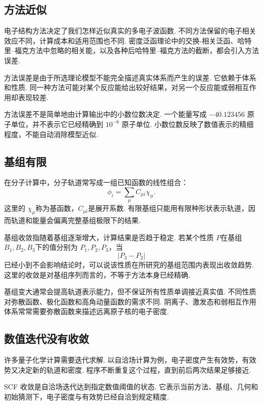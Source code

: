 \documentclass[UTF8,11pt,a4paper,openany]{ctexbook}
\begin{document}
\subsection{方法近似}

电子结构方法决定了我们怎样近似真实的多电子波函数. 不同方法保留的电子相关效应不同，计算成本和适用范围也不同. 密度泛函理论中的交换-相关泛函、哈特里--福克方法中忽略的相关能，以及各种后哈特里--福克方法的截断，都会引入方法误差. 

\begin{definitionbox}
方法误差是由于所选理论模型不能完全描述真实体系而产生的误差. 它依赖于体系和性质. 同一种方法可能对某个反应能给出较好结果，对另一个反应能或弱相互作用却表现较差. 
\end{definitionbox}

方法误差不是简单地由计算输出中的小数位数决定. 一个能量写成 $-40.123456$ 原子单位，并不表示它已经精确到 $10^{-6}$ 原子单位. 小数位数反映了数值表示的精细程度，不能自动消除模型近似. 

\subsection{基组有限}

在分子计算中，分子轨道常写成一组已知函数的线性组合：
\[
\phi_i=\sum_{\mu}C_{\mu i}\chi_\mu.
\]
这里的 $\chi_\mu$称为基函数，$C_{\mu i}$是展开系数. 有限基组只能用有限种形状表示轨道，因而轨道和能量会偏离完整基组极限下的结果. 

\begin{notationbox}
基组收敛指随着基组逐渐增大，计算结果是否趋于稳定. 若某个性质 $P$在基组 $B_1,B_2,B_3$下的值分别为 $P_1,P_2,P_3$，当
\[
|P_3-P_2|
\]
已经小到不会影响结论时，可以说该性质在所研究的基组范围内表现出收敛趋势. 这里的收敛是对基组序列而言的，不等于方法本身已经精确. 
\end{notationbox}

基组变大通常会提高轨道表示能力，但不保证所有性质单调接近真实值. 不同性质对弥散函数、极化函数和高角动量函数的需求不同. 阴离子、激发态和弱相互作用体系常常需要弥散函数来描述远离原子核的电子密度. 

\subsection{数值迭代没有收敛}

许多量子化学计算需要迭代求解. 以自洽场计算为例，电子密度产生有效势，有效势又决定新的轨道和密度. 程序不断重复这个过程，直到前后两次结果足够接近. 

\begin{definitionbox}
SCF 收敛是自洽场迭代达到指定数值阈值的状态. 它表示当前方法、基组、几何和初始猜测下，电子密度与有效势已经自洽到规定精度. 
\end{definitionbox}
\end{document}
